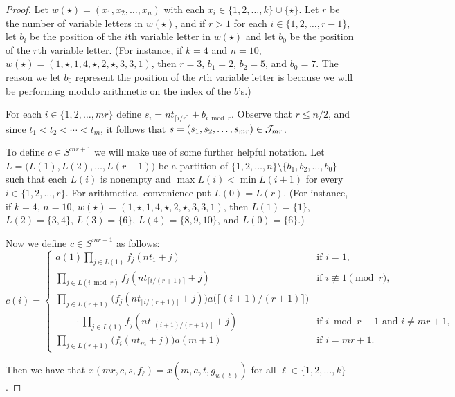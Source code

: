 \begin{proof}
  Let $w(\star) = (x_1, x_2, \ldots, x_n)$ with each $x_i \in \{1, 2, \ldots, k\} \cup \{\star\}$. 
  Let $r$ be the number of variable letters in $w(\star)$, and if $r > 1$ for each $i \in \{1, 2, \ldots, r-1\}$, let $b_i$ be the position of the \mbox{$i$th} variable letter in $w(\star)$ and let $b_0$ be the position of the \mbox{$r$th} variable letter.
  (For instance, if $k = 4$ and $n = 10$, $w(\star) = (1, \star, 1, 4, \star, 2, \star, 3, 3, 1)$, then $r = 3$, $b_1 = 2$, $b_2 = 5$, and $b_0 = 7$.
  The reason we let $b_0$ represent the position of the \mbox{$r$th} variable letter is because we will be performing modulo arithmetic on the index of the $b$'s.)

  For each $i \in \{1, 2, \ldots, mr\}$ define $s_i = nt_{\lceil i/r \rceil} + b_{i \bmod r}$.
  Observe that $r \le n/2$, and since $t_1 < t_2 < \cdots < t_m$, it follows that $s = (s_1, s_2, \ldots, s_{mr}) \in \mathcal{J}_{mr}$.

  To define $c \in S^{mr+1}$ we will make use of some further helpful notation. 
  Let $L = \bigl( L(1), L(2), \ldots, L(r+1) \bigr)$ be a partition of $\{1, 2, \ldots, n\} \setminus \{b_1, b_2, \ldots, b_0\}$ such that each $L(i)$ is nonempty and $\max L(i) < \min L(i+1)$ for every $i \in \{1, 2, \ldots, r\}$. 
  For arithmetical convenience put $L(0) = L(r)$. 
  (For instance, if $k = 4$, $n = 10$, $w(\star) = (1, \star, 1, 4, \star, 2, \star, 3, 3, 1)$, then $L(1) = \{1\}$, $L(2) = \{3,4\}$, $L(3) = \{6\}$, $L(4) = \{8, 9, 10\}$, and $L(0) = \{6\}$.)

  Now we define $c \in S^{mr+1}$ as follows:
  \[
    c(i) = 
    \begin{cases}
      a(1)\prod_{j \in L(1)} f_j(nt_1 + j) & \mbox{if $i = 1$,} \\
      \prod_{j \in L(i \bmod r)}  f_j(nt_{\lceil i/(r+1) \rceil} + j) & \mbox{if $i \not\equiv 1 \pmod r$, }\\
      \prod_{j \in L(r+1)} \bigl( f_j(nt_{\lceil i/(r+1) \rceil} + j) \bigr) a\bigl( \lceil (i+1)/(r+1) \rceil \bigr) & \\
      \hspace{2em} \cdot\prod_{j \in L(1)} f_j(nt_{\lceil (i+1)/(r+1) \rceil} + j) & \mbox{if $i \bmod r \equiv 1$ and $i \ne mr +1$, }\\
      \prod_{j \in L(r+1)} \bigr( f_i(nt_m + j) \bigr) a(m+1) & \mbox{if $i = mr + 1$.}
    \end{cases}
  \]

  Then we have that $x(mr, c, s, f_\ell) = x(m, a, t, g_{w(\ell)})$ for all $\ell \in \{1, 2, \ldots, k\}$.
\end{proof}

